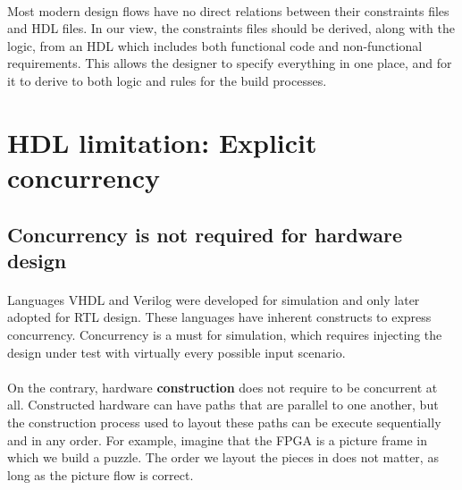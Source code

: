 \paragraph{}Most modern design flows have no direct relations between their constraints files and HDL files. In our view, the constraints files should be derived, along with the logic, from an HDL which includes both functional code and non-functional requirements. This allows the designer to specify everything in one place, and for it to derive to both logic and rules for the build processes. 


\section{HDL limitation: Explicit concurrency}
\label{sec:limitation_concur}
\subsection*{Concurrency is not required for hardware design}
\paragraph{}Languages VHDL and Verilog were developed for simulation and only later adopted for RTL design. These languages have inherent constructs to express concurrency. Concurrency is a must for simulation, which requires injecting the design under test with virtually every possible input scenario. 
\paragraph{}On the contrary, hardware \textbf{construction} does not require to be concurrent at all. Constructed hardware can have paths that are parallel to one another, but the construction process used to layout these paths can be execute sequentially and in any order. For example, imagine that the FPGA is a picture frame in which we build a puzzle. The order we layout the pieces in does not matter, as long as the picture flow is correct.
